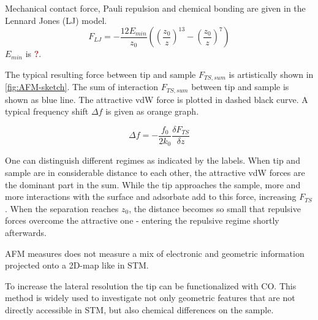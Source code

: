 Mechanical contact force, Pauli repulsion and chemical bonding are given in the Lennard Jones (LJ) model\cite{jones_determination_1924}.
\begin{equation} \label{eq:LJ}
 F_{LJ} = - \frac{12 E_{min}}{z_0} \left ( \left (\frac{z_0}{z} \right ) ^{13} - \left ( \frac{z_0}{z} \right )^7 \right )
\end{equation}
$E_{min}$ is \textcolor{red}{\textbf{?}}.

The typical resulting force between tip and sample $F_{TS,sum}$ is artistically shown in \autoref{fig:AFM-sketch}. 
The sum of interaction $F_{TS,sum}$ between tip and sample is shown as blue  line. The attractive vdW force is plotted in dashed black curve. A typical frequency shift $\Delta f$ is given as orange graph. 

$$\Delta f = - \frac{f_0}{2k_0}\frac{\delta F_{TS}}{\delta z}$$


One can distinguish different regimes as indicated by the labels. When tip and sample are in considerable distance to each other, the attractive vdW forces are the dominant part in the sum. While the tip approaches the sample, more and more interactions with the surface and adsorbate add to this force, increasing $F_{TS}$. When the separation reaches $z_0$, the distance becomes so small that repulsive forces overcome the attractive one - entering the repulsive regime shortly afterwards. 


AFM measures does not measure a mix of electronic and geometric information projected onto a 2D-map like in STM.

To increase the lateral resolution the tip can be functionalized with CO. This method is widely used \cite{albrecht_direct_2016, kawai_multiple_2018, kawai_atomically_2015, schulz_elemental_2018, gross_chemical_2009, pavlicek_generation_2017, schwarz_corrugation_2017} to investigate not only geometric features that are not directly accessible in STM, but also chemical differences on the sample\cite{wang_exploration_2017}.

